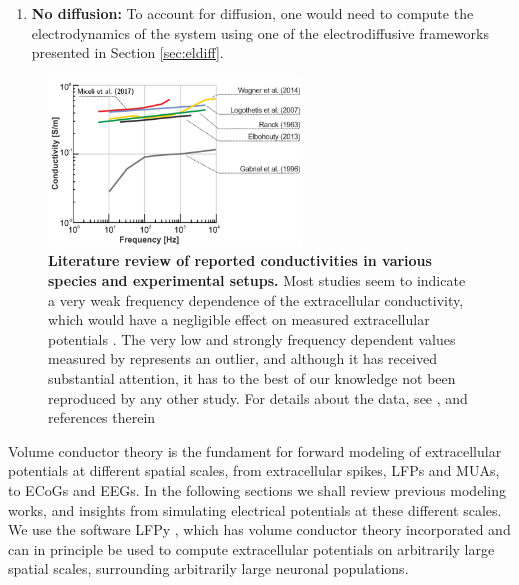 \documentclass[preprint,11pt,authoryear]{elsarticle}
\begin{document}
\begin{enumerate}
\item {\bf No diffusion:} To account for diffusion, one would need to compute the electrodynamics of the system using one of the electrodiffusive frameworks presented in Section \ref{sec:eldiff}.

\end{enumerate}


\begin{figure}[!ht]
\begin{center}
\includegraphics[width=0.6\textwidth]{frequency_dependence}
\end{center}
\caption{\textbf{Literature review of reported conductivities in various species and experimental setups.} 
Most studies seem to indicate a very weak frequency dependence of the extracellular conductivity, which would have a negligible effect on measured extracellular potentials \citep{Miceli2017}. The very low and strongly frequency dependent values measured by \cite{Gabriel1996} represents an outlier, and although it has received substantial attention, it has to the best of our knowledge not been reproduced by any other study.
For details about the data, see \citep{Miceli2017}, and references therein \citep{Ranck1963, Gabriel1996, Logothetis2007, Elbohouty2013, Wagner2014}
}
\label{fig:freq_dep}
\end{figure}



Volume conductor theory is the fundament for forward modeling of extracellular potentials at different spatial scales, from extracellular spikes, LFPs and MUAs, to ECoGs and EEGs. In the following sections we shall review previous modeling works, and insights from simulating electrical potentials at these different scales.
We use the software LFPy \citep{Linden2014, Hagen2018, Hagen2019}, which has volume conductor theory incorporated and can in principle be used to compute extracellular potentials on arbitrarily large spatial scales, surrounding arbitrarily large neuronal populations. 
\end{document}
